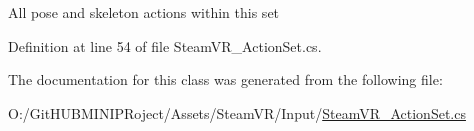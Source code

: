 All pose and skeleton actions within this set 



Definition at line 54 of file Steam\+V\+R\+\_\+\+Action\+Set.\+cs.



The documentation for this class was generated from the following file\+:\begin{DoxyCompactItemize}
\item 
O\+:/\+Git\+H\+U\+B\+M\+I\+N\+I\+P\+Roject/\+Assets/\+Steam\+V\+R/\+Input/\mbox{\hyperlink{_steam_v_r___action_set_8cs}{Steam\+V\+R\+\_\+\+Action\+Set.\+cs}}\end{DoxyCompactItemize}
